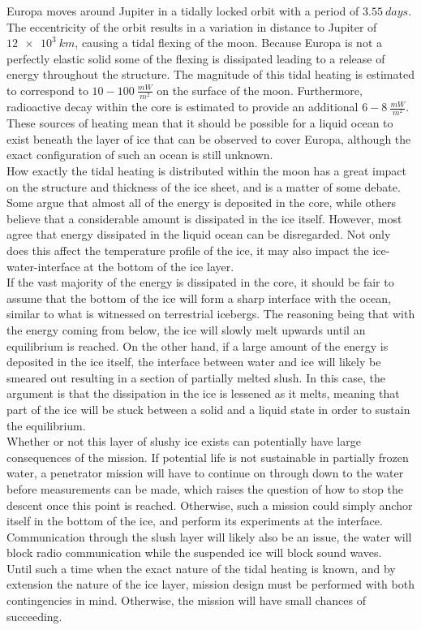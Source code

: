 Europa moves around Jupiter in a tidally locked orbit with a period of $\SI{3.55}{days}$\cite{website:europaOrbitData}. The eccentricity of the orbit results in a variation in distance to Jupiter of $\SI{12e3}{km}$, causing a tidal flexing of the moon. Because Europa is not a perfectly elastic solid some of the flexing is dissipated leading to a release of energy throughout the structure. The magnitude of this tidal heating is estimated to correspond to $10-\SI{100}{\frac{mW}{m^2}}$ on the surface of the moon\cite{article:barr2014a}. Furthermore, radioactive decay within the core is estimated to provide an additional $6-\SI{8}{\frac{mW}{m^2}}$\cite{article:barr2014a}. These sources of heating mean that it should be possible for a liquid ocean to exist beneath the layer of ice that can be observed to cover Europa, although the exact configuration of such an ocean is still unknown.\\

\noindent
How exactly the tidal heating is distributed within the moon has a great impact on the structure and thickness of the ice sheet, and is a matter of some debate. Some argue that almost all of the energy is deposited in the core\cite{article:lowell2005a}, while others believe that a considerable amount is dissipated in the ice itself\cite{article:mccarthy2016a}. However, most agree that energy dissipated in the liquid ocean can be disregarded\cite{article:chen2014a}. Not only does this affect the temperature profile of the ice, it may also impact the ice-water-interface at the bottom of the ice layer.\\

\noindent
If the vast majority of the energy is dissipated in the core, it should be fair to assume that the bottom of the ice will form a sharp interface with the ocean, similar to what is witnessed on terrestrial icebergs. The reasoning being that with the energy coming from below, the ice will slowly melt upwards until an equilibrium is reached. On the other hand, if a large amount of the energy is deposited in the ice itself, the interface between water and ice will likely be smeared out resulting in a section of partially melted slush. In this case, the argument is that the dissipation in the ice is lessened as it melts, meaning that part of the ice will be stuck between a solid and a liquid state in order to sustain the equilibrium.\\

\noindent
Whether or not this layer of slushy ice exists can potentially have large consequences of the mission. If potential life is not sustainable in partially frozen water, a penetrator mission will have to continue on through down to the water before measurements can be made, which raises the question of how to stop the descent once this point is reached. Otherwise, such a mission could simply anchor itself in the bottom of the ice, and perform its experiments at the interface. Communication through the slush layer will likely also be an issue, the water will block radio communication while the suspended ice will block sound waves.\\

\noindent
Until such a time when the exact nature of the tidal heating is known, and by extension the nature of the ice layer, mission design must be performed with both contingencies in mind. Otherwise, the mission will have small chances of succeeding.